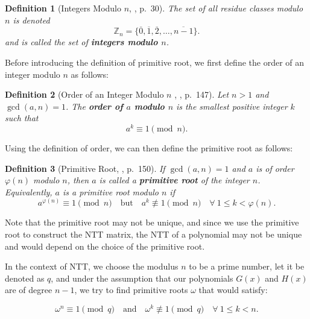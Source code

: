 \documentclass[12pt]{article}
\newtheorem{definition}{Definition}[section]
\begin{document}
\begin{definition}[Integers Modulo $n$, \cite{algebra}, p.~30]
    The set of all residue classes modulo $n$ is denoted 
    \begin{equation}
    \mathbb{Z}_n = \{\overline{0}, \overline{1}, \overline{2}, \ldots, \overline{n - 1}\}.
    \end{equation}
    and is called the set of \textbf{integers modulo $n$}.
\end{definition}

Before introducing the definition of primitive root, 
we first define the order of an integer modulo $n$ as follows:

\begin{definition}[Order of an Integer Modulo $n$ , \cite{number_theory}, p.~147]
    Let $n > 1$ and $\gcd(a, n) = 1$. 
    The \textbf{order of $a$ modulo $n$} is the smallest positive integer $k$ such that
    \begin{equation}
    a^k \equiv 1 \pmod{n}.
    \end{equation}
\end{definition}

Using the definition of order, we can then define the primitive root as follows:

\begin{definition}[Primitive Root, \cite{number_theory}, p.~150]
    If $\gcd(a, n) = 1$ and $a$ is of order $\varphi(n)$ modulo $n$, 
    then $a$ is called a \textbf{primitive root} of the integer $n$.
    Equivalently, $a$ is a primitive root modulo $n$ if
    \begin{equation}
    a^{\varphi(n)} \equiv 1 \pmod{n} \quad \text{but} \quad a^k \not\equiv 1 \pmod{n} \quad \forall \ 1 \leq k < \varphi(n).
    \end{equation}
\end{definition}

Note that the primitive root may not be unique, and since we use the primitive root to construct the NTT matrix, 
the NTT of a polynomial may not be unique and would depend on the choice of the primitive root.
\cite[pp.~5--6]{beginner_guide}
\bigskip

In the context of NTT, we choose the modulus $n$ to be a prime number, let it be denoted as $q$, 
and under the assumption that our polynomials $G(x)$ and $H(x)$ are of degree $n-1$, 
we try to find primitive roots $\omega$ that would satisfy:

\begin{equation}
    \omega^n \equiv 1 \pmod{q} \quad \text{and} \quad \omega^k \not\equiv 1 \pmod{q} \quad \forall \ 1 \leq k < n.
\end{equation}
\end{document}
